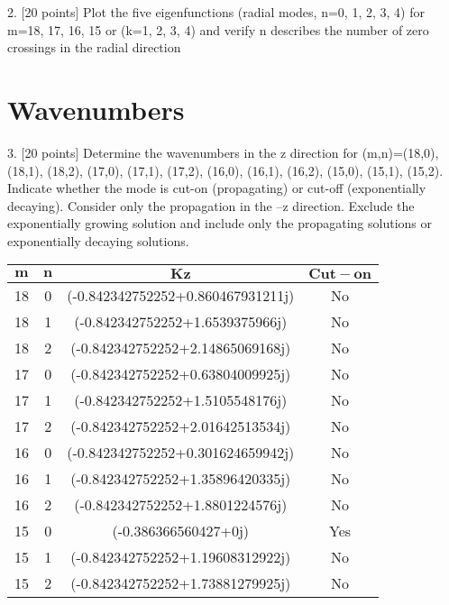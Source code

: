 \documentclass[]{aiaa-tc}%
\begin{document}
2. [20 points] Plot the five eigenfunctions (radial modes, n=0, 1, 2, 3, 4) for m=18, 17, 16, 15 or (k=1, 2, 3, 4) and verify n describes the number of zero crossings in the radial direction

\section{Wavenumbers}

3. [20 points] Determine the wavenumbers in the z direction for (m,n)=(18,0), (18,1), (18,2), (17,0), (17,1), (17,2), (16,0), (16,1), (16,2), (15,0), (15,1), (15,2). Indicate whether the mode is cut-on (propagating) or cut-off (exponentially decaying). Consider only the propagation in the –z direction. Exclude the exponentially growing solution and include only the propagating solutions or exponentially decaying solutions.


\begin{tabular}{| c c c c |}
\hline
$\mathbf{m}$ &  $\mathbf{n}$ &                      $\mathbf{Kz}$ & $\mathbf{Cut-on}$ \\
\hline
18 &             0 &  (-0.842342752252+0.860467931211j) &                No \\
18 &             1 &    (-0.842342752252+1.6539375966j) &                No \\
18 &             2 &   (-0.842342752252+2.14865069168j) &                No \\
\hline
17 &             0 &  (-0.842342752252+0.63804009925j) &                No \\
17 &             1 &   (-0.842342752252+1.5105548176j) &                No \\
17 &             2 &  (-0.842342752252+2.01642513534j) &                No \\
\hline
16 &             0 &  (-0.842342752252+0.301624659942j) &                No \\
16 &             1 &   (-0.842342752252+1.35896420335j) &                No \\
16 &             2 &    (-0.842342752252+1.8801224576j) &                No \\
\hline
15 &             0 &              (-0.386366560427+0j) &               Yes \\
15 &             1 &  (-0.842342752252+1.19608312922j) &                No \\
15 &             2 &  (-0.842342752252+1.73881279925j) &                No \\
\hline
\end{tabular}
\end{document}

